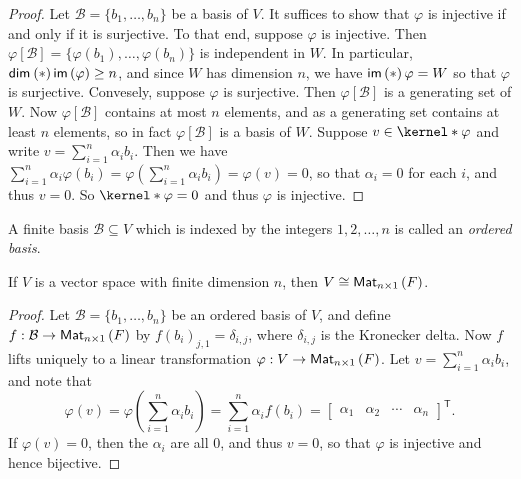 \documentclass{memoir}
\begin{document}
\begin{proof}
Let $\mathcal{B} = \{b_1,\ldots,b_n\}$ be a basis of $V$. It suffices to show that $\varphi$ is injective if and only if it is surjective. To that end, suppose $\varphi$ is injective. Then $\varphi[\mathcal{B}] = \{\varphi(b_1), \ldots, \varphi(b_n)\}$ is independent in $W$. In particular, $\operatorname{\mathsf{dim}}_{}\left(*\right){\mathsf{im}\left(\varphi\right)} \geq n$, and since $W$ has dimension $n$, we have $\mathsf{im}\left(*\right){\varphi} = W$ so that $\varphi$ is surjective. Convesely, suppose $\varphi$ is surjective. Then $\varphi[\mathcal{B}]$ is a generating set of $W$. Now $\varphi[\mathcal{B}]$ contains at most $n$ elements, and as a generating set contains at least $n$ elements, so in fact $\varphi[\mathcal{B}]$ is a basis of $W$. Suppose $v \in \kernel*{\varphi}$ and write $v = \sum_{i=1}^n \alpha_i b_i$. Then we have $\sum_{i=1}^n \alpha_i \varphi(b_i) = \varphi\left( \sum_{i=1}^n \alpha_i b_i\right) = \varphi(v) = 0$, so that $\alpha_i = 0$ for each $i$, and thus $v = 0$. So $\kernel*{\varphi} = 0$ and thus $\varphi$ is injective.
\end{proof}

\begin{dfn}
A finite basis $\mathcal{B} \subseteq V$ which is indexed by the integers $1, 2, \ldots, n$ is called an \emph{ordered basis}.
\end{dfn}

\begin{prp}
If $V$ is a vector space with finite dimension $n$, then $V \cong {\mathsf{Mat}_{{n} \times {1}}}\left(F\right)$.
\end{prp}

\begin{proof}
Let $\mathcal{B} = \{b_1,\ldots,b_n\}$ be an ordered basis of $V$, and define $f : \mathcal{B} \rightarrow {\mathsf{Mat}_{{n} \times {1}}}\left(F\right)$ by $f(b_i)_{j,1} = \delta_{i,j}$, where $\delta_{i,j}$ is the Kronecker delta. Now $f$ lifts uniquely to a linear transformation $\varphi : V \rightarrow {\mathsf{Mat}_{{n} \times {1}}}\left(F\right)$. Let $v = \sum_{i=1}^n \alpha_i b_i$, and note that \[ \varphi(v) = \varphi\left(\sum_{i=1}^n \alpha_i b_i \right) = \sum_{i=1}^n \alpha_i f(b_i) = \begin{bmatrix} \alpha_1 & \alpha_2 & \cdots & \alpha_n \end{bmatrix}^\mathsf{T}. \] If $\varphi(v) = 0$, then the $\alpha_i$ are all 0, and thus $v = 0$, so that $\varphi$ is injective and hence bijective.
\end{proof}
\end{document}
